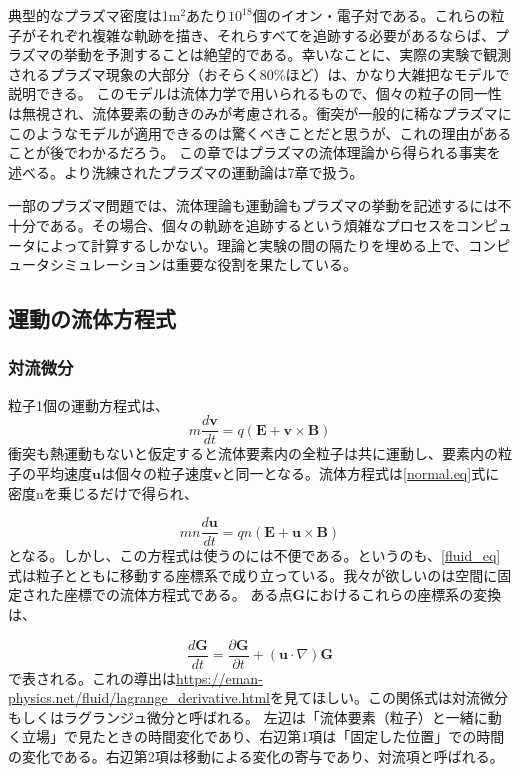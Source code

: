\documentclass{ltjsarticle}
\numberwithin{equation}{section} %
\begin{document}
典型的なプラズマ密度は1$\si{\metre^2}$あたり$10^{18}$個のイオン・電子対である。これらの粒子がそれぞれ複雑な軌跡を描き、それらすべてを追跡する必要があるならば、プラズマの挙動を予測することは絶望的である。幸いなことに、実際の実験で観測されるプラズマ現象の大部分（おそらく80\%ほど）は、かなり大雑把なモデルで説明できる。
このモデルは流体力学で用いられるもので、個々の粒子の同一性は無視され、流体要素の動きのみが考慮される。衝突が一般的に稀なプラズマにこのようなモデルが適用できるのは驚くべきことだと思うが、これの理由があることが後でわかるだろう。
この章ではプラズマの流体理論から得られる事実を述べる。より洗練されたプラズマの運動論は7章で扱う。

一部のプラズマ問題では、流体理論も運動論もプラズマの挙動を記述するには不十分である。その場合、個々の軌跡を追跡するという煩雑なプロセスをコンピュータによって計算するしかない。理論と実験の間の隔たりを埋める上で、コンピュータシミュレーションは重要な役割を果たしている。

\subsection{運動の流体方程式}
\subsubsection{対流微分}

粒子1個の運動方程式は、
\begin{equation}
  m\frac{d\bm{v}}{dt} = q(\bm{E}+\bm{v}\times \bm{B}) \label{normal.eq}
\end{equation}
衝突も熱運動もないと仮定すると流体要素内の全粒子は共に運動し、要素内の粒子の平均速度$\bm{u}$は個々の粒子速度$\bm{v}$と同一となる。流体方程式は\eqref{normal.eq}式に密度nを乗じるだけで得られ、

\begin{equation}
  mn\frac{d\bm{u}}{dt} = qn(\bm{E}+\bm{u}\times \bm{B}) \label{fluid_eq}
\end{equation}
となる。しかし、この方程式は使うのには不便である。というのも、\eqref{fluid_eq}式は粒子とともに移動する座標系で成り立っている。我々が欲しいのは空間に固定された座標での流体方程式である。
ある点$\bm{G}$におけるこれらの座標系の変換は、

\begin{equation}
  \frac{d\bm{G}}{dt} = \frac{\partial \bm{G}}{\partial t} + (\bm{u}\cdot \nabla)\bm{G}
\end{equation}
で表される。これの導出は\url{https://eman-physics.net/fluid/lagrange_derivative.html}を見てほしい。この関係式は対流微分もしくはラグランジュ微分と呼ばれる。
左辺は「流体要素（粒子）と一緒に動く立場」で見たときの時間変化であり、右辺第1項は「固定した位置」での時間の変化である。右辺第2項は移動による変化の寄与であり、対流項と呼ばれる。
\end{document}
